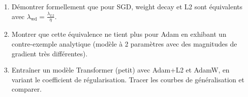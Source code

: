\begin{exercice}
\begin{enumerate}
  \item D\'emontrer formellement que pour SGD, weight decay et L2 sont
    \'equivalents avec $\lambda_{\text{wd}} = \frac{\lambda_{L2}}{\eta}$.
  \item Montrer que cette \'equivalence ne tient plus pour Adam en exhibant
    un contre-exemple analytique (mod\`ele \`a 2 param\`etres avec des
    magnitudes de gradient tr\`es diff\'erentes).
  \item Entra\^iner un mod\`ele Transformer (petit) avec Adam+L2 et AdamW,
    en variant le coefficient de r\'egularisation. Tracer les courbes de
    g\'en\'eralisation et comparer.
\end{enumerate}
\end{exercice}
